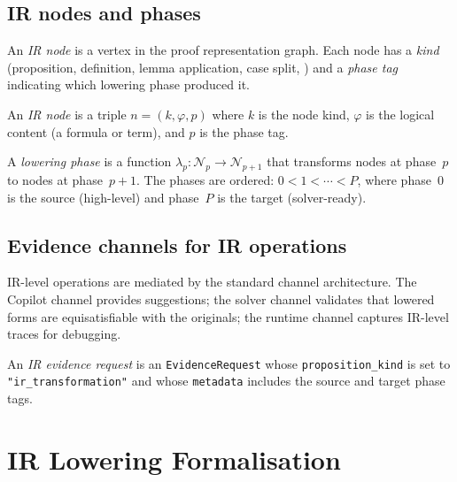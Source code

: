 \documentclass[11pt]{article}
\begin{document}
\subsection{IR nodes and phases}

An \emph{IR node} is a vertex in the proof representation
graph.  Each node has a \emph{kind} (proposition, definition,
lemma application, case split, \etc{}) and a \emph{phase tag}
indicating which lowering phase produced it.

\begin{definition}[IR node]\label{def:irnode}
An \emph{IR node} is a triple $n = (k, \varphi, p)$ where
$k$ is the node kind, $\varphi$ is the logical content
(a formula or term), and $p$ is the phase tag.
\end{definition}

\begin{definition}\label{def:phase}
A \emph{lowering phase} is a function
$\lambda_p \colon \mathcal{N}_p \to \mathcal{N}_{p+1}$
that transforms nodes at phase~$p$ to nodes at phase~$p+1$.
The phases are ordered: $0 < 1 < \cdots < P$, where phase~0
is the source (high-level) and phase~$P$ is the target
(solver-ready).
\end{definition}

\subsection{Evidence channels for IR operations}

IR-level operations are mediated by the standard channel
architecture.  The Copilot channel provides suggestions;
the solver channel validates that lowered forms are
equisatisfiable with the originals; the runtime channel
captures IR-level traces for debugging.

\begin{definition}\label{def:irreq}
An \emph{IR evidence request} is an \texttt{EvidenceRequest}
whose \texttt{proposition\_kind} is set to
\texttt{"ir\_transformation"} and whose \texttt{metadata}
includes the source and target phase tags.
\end{definition}

\section{IR Lowering Formalisation}\label{sec:lowering}
\end{document}
